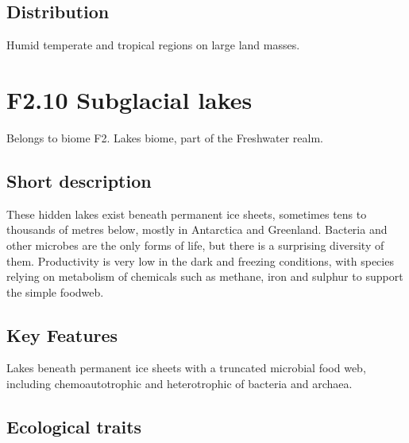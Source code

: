 \documentclass[
  letterpaper,
  DIV=11,
  numbers=noendperiod]{scrartcl}
\begin{document}
\subsection{Distribution}\label{distribution-7}

Humid temperate and tropical regions on large land masses.

\section{F2.10 Subglacial lakes}\label{f2.10-subglacial-lakes}

Belongs to biome F2. Lakes biome, part of the Freshwater realm.

\subsection{Short description}\label{short-description-8}

These hidden lakes exist beneath permanent ice sheets, sometimes tens to
thousands of metres below, mostly in Antarctica and Greenland. Bacteria
and other microbes are the only forms of life, but there is a surprising
diversity of them. Productivity is very low in the dark and freezing
conditions, with species relying on metabolism of chemicals such as
methane, iron and sulphur to support the simple foodweb.

\subsection{Key Features}\label{key-features-8}

Lakes beneath permanent ice sheets with a truncated microbial food web,
including chemoautotrophic and heterotrophic of bacteria and archaea.

\subsection{Ecological traits}\label{ecological-traits-8}
\end{document}
